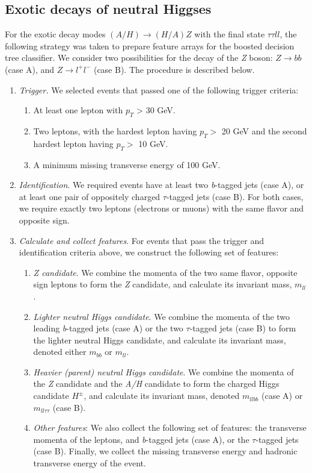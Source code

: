 {\subsection{Exotic decays of neutral Higgses}\label{subsec:A_HZ_analysis}
For the exotic decay modes $(A/H)\rightarrow(H/A)Z$ with the final state $\tau\tau ll$, the following strategy was taken to prepare feature arrays for the boosted decision tree classifier. We consider two possibilities for the decay of the \emph{Z} boson: $Z\rightarrow bb$ (case A), and $Z\rightarrow l^+l^-$ (case B). The procedure is described below.
\begin{enumerate}
  \item \emph{Trigger.} We selected events that passed one of the following trigger criteria:
    \begin{enumerate}
      \item At least one lepton with $p_T$ > 30 GeV.
      \item Two leptons, with the hardest lepton having $p_T > $ 20 GeV and the second hardest lepton having $p_T > $ 10 GeV.
      \item A minimum missing transverse energy of 100 GeV.
    \end{enumerate}
  \item \emph{Identification}. We required events have at least two \emph{b}-tagged jets (case A), or at least one pair of oppositely charged $\tau$-tagged jets (case B). For both cases, we require exactly two leptons (electrons or muons) with the same flavor and opposite sign.
  \item\emph{Calculate and collect features}. For events that pass the trigger and identification criteria above, we construct the following set of features:
    \begin{enumerate}
      \item {\itshape \emph{Z} candidate}. We combine the momenta of the two same flavor, opposite sign leptons to form the \emph{Z} candidate, and calculate its invariant mass,  $m_{ll}$.
      \item {\itshape Lighter neutral Higgs candidate}. We combine the momenta of the two leading \emph{b}-tagged jets (case A) or the two $\tau$-tagged jets (case B) to form the lighter neutral Higgs candidate, and calculate its invariant mass, denoted either $m_{bb}$ or $m_{ll}$.
      \item {\itshape Heavier (parent) neutral Higgs candidate}. We combine the momenta of the \emph{Z} candidate and the \emph{A/H} candidate to form the charged Higgs candidate $H^\pm$, and calculate its invariant mass, denoted $m_{llbb}$ (case A) or $m_{ll\tau\tau}$ (case B).
      \item {\itshape Other features}: We also collect the following set of features: the transverse momenta of the leptons, and \emph{b}-tagged jets (case A), or the $\tau$-tagged jets (case B). Finally, we collect the missing transverse energy and hadronic transverse energy of the event.
    \end{enumerate}
\end{enumerate}
}
